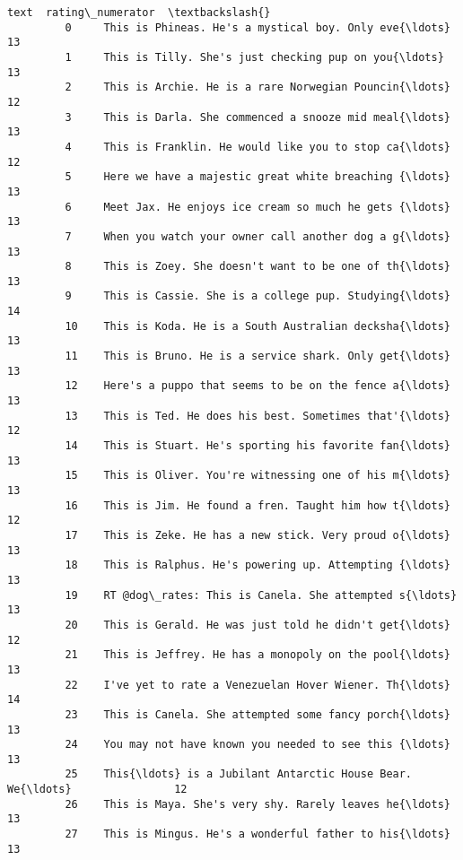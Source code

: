 \documentclass[11pt]{article}
\begin{document}
\begin{Verbatim}[commandchars=\\\{\}]
                                                            text  rating\_numerator  \textbackslash{}
         0     This is Phineas. He's a mystical boy. Only eve{\ldots}                13   
         1     This is Tilly. She's just checking pup on you{\ldots}                13   
         2     This is Archie. He is a rare Norwegian Pouncin{\ldots}                12   
         3     This is Darla. She commenced a snooze mid meal{\ldots}                13   
         4     This is Franklin. He would like you to stop ca{\ldots}                12   
         5     Here we have a majestic great white breaching {\ldots}                13   
         6     Meet Jax. He enjoys ice cream so much he gets {\ldots}                13   
         7     When you watch your owner call another dog a g{\ldots}                13   
         8     This is Zoey. She doesn't want to be one of th{\ldots}                13   
         9     This is Cassie. She is a college pup. Studying{\ldots}                14   
         10    This is Koda. He is a South Australian decksha{\ldots}                13   
         11    This is Bruno. He is a service shark. Only get{\ldots}                13   
         12    Here's a puppo that seems to be on the fence a{\ldots}                13   
         13    This is Ted. He does his best. Sometimes that'{\ldots}                12   
         14    This is Stuart. He's sporting his favorite fan{\ldots}                13   
         15    This is Oliver. You're witnessing one of his m{\ldots}                13   
         16    This is Jim. He found a fren. Taught him how t{\ldots}                12   
         17    This is Zeke. He has a new stick. Very proud o{\ldots}                13   
         18    This is Ralphus. He's powering up. Attempting {\ldots}                13   
         19    RT @dog\_rates: This is Canela. She attempted s{\ldots}                13   
         20    This is Gerald. He was just told he didn't get{\ldots}                12   
         21    This is Jeffrey. He has a monopoly on the pool{\ldots}                13   
         22    I've yet to rate a Venezuelan Hover Wiener. Th{\ldots}                14   
         23    This is Canela. She attempted some fancy porch{\ldots}                13   
         24    You may not have known you needed to see this {\ldots}                13   
         25    This{\ldots} is a Jubilant Antarctic House Bear. We{\ldots}                12   
         26    This is Maya. She's very shy. Rarely leaves he{\ldots}                13   
         27    This is Mingus. He's a wonderful father to his{\ldots}                13   

\end{Verbatim}
\end{document}
